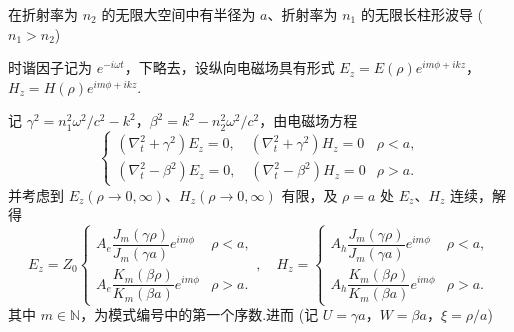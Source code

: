 在折射率为 \( n_2 \) 的无限大空间中有半径为 \( a \)、折射率为 \( n_1 \) 的无限长柱形波导 (\( n_1 > n_2 \))

时谐因子记为 \( e^{-i\omega t} \)，下略去，设纵向电磁场具有形式
\( E_z = E (\rho) e^{im\phi + ikz} \)，\( H_z = H (\rho) e^{im\phi + ikz} \).

记 \( \gamma^2 = n_1^2 \omega^2/c^2 - k^2 \)，\( \beta^2 = k^2 - n_2^2 \omega^2/c^2 \)，由电磁场方程
\begin{equation*}
	\begin{cases}
		\left( \nabla_t^2 + \gamma^2 \right) E_z = 0, \quad \left( \nabla_t^2 + \gamma^2 \right) H_z = 0 & \rho < a, \\
		\left( \nabla_t^2 - \beta^2 \right) E_z = 0, \quad \left( \nabla_t^2 - \beta^2 \right) H_z = 0   & \rho > a.
	\end{cases}
\end{equation*}
并考虑到 \( E_z (\rho \to 0, \infty) \)、\( H_z (\rho \to 0, \infty) \) 有限，及 \( \rho = a \) 处 \( E_z \)、\( H_z \) 连续，解得
\begin{equation*}
	E_z = Z_0
	\begin{cases}
		A_e \dfrac{J_m(\gamma \rho)}{J_m(\gamma a)} e^{im\phi} & \rho < a, \\[8pt]
		A_e \dfrac{K_m(\beta \rho)}{K_m(\beta a)} e^{im\phi}   & \rho > a.
	\end{cases},\quad
	H_z =
	\begin{cases}
		A_h \dfrac{J_m(\gamma \rho)}{J_m(\gamma a)} e^{im\phi} & \rho < a, \\[8pt]
		A_h \dfrac{K_m(\beta \rho)}{K_m(\beta a)} e^{im\phi}   & \rho > a.
	\end{cases}
\end{equation*}
其中 \( m \in \mathbb{N} \)，为模式编号中的第一个序数.进而 (记 \( U = \gamma a \)，\( W = \beta a \)，\( \xi = \rho/a \))
